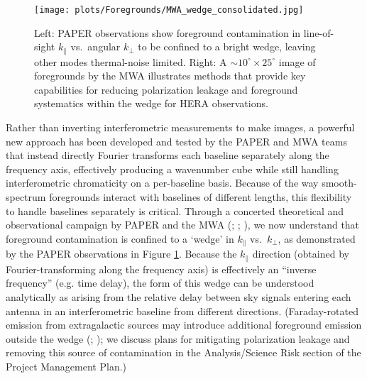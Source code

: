 \documentclass[preprint]{aastex}
\newcommand{\Mycitep}[1]{{\bf \citep{#1}}}
\newcommand{\Mycitealt}[1]{{\bf \citealt{#1}}}
\newcommand{\Caption}[4]{\vspace{#1}\renewcommand{\baselinestretch}{#2}\caption{#4}\vspace{#3}}
\def\kperp{k_{\bot}}
\def\kpar{k_{\|}}
\def\kperp{k_{\bot}}
\def\kpar{k_{\|}}
\begin{document}
\begin{figure}[t] \centering
\texttt{[image: plots/Foregrounds/MWA\_wedge\_consolidated.jpg]}
\Caption{-0.3in}{0.99}{-0.15in}{\small Left:
PAPER observations \Mycitep{pober_et_al2013} show foreground contamination 
in line-of-sight $\kpar$ vs.\ angular $\kperp$ to be
confined to a bright wedge,
leaving other modes thermal-noise limited.
Right:
A $\sim10^{\circ} \times 25^{\circ}$ image of foregrounds by the MWA illustrates
methods that provide key capabilities for reducing
polarization leakage and foreground systematics within the wedge for HERA observations.  
}\label{fig:twoFGViews} \end{figure}


Rather than inverting interferometric measurements to make images,
a powerful new approach has been developed and tested by the PAPER
and MWA teams that instead directly Fourier transforms each baseline separately along the frequency axis,
effectively producing a wavenumber cube while still handling interferometric
chromaticity on a per-baseline basis.  Because of the way smooth-spectrum foregrounds
interact with baselines of different lengths, this flexibility to handle
baselines separately is critical.
Through a concerted theoretical and observational campaign by PAPER and the MWA
(\Mycitealt{morales_et_al2012,parsons_et_al2012b}; \citealt{vedantham_2012}; \Mycitealt{Datta_2010,hazelton_et_al2013,pober_et_al2013,parsons_et_al2013,dillon_et_al2013b}),
we now understand that foreground contamination is confined to a `wedge' in
$\kpar$ vs.\ $\kperp$, as demonstrated by the PAPER observations in 
Figure \ref{fig:twoFGViews}. Because the $\kpar$ direction (obtained by
Fourier-transforming along the frequency axis) is effectively an ``inverse frequency'' (e.g. time delay),
the form of this wedge can be understood analytically as arising from the relative delay between sky signals
entering each antenna in an interferometric baseline from different directions.
(Faraday-rotated emission from extragalactic sources may introduce additional foreground emission outside the wedge (\citealt{labropoulos_et_al2009,jelic_et_al2010}; \Mycitealt{moore_et_al2013});
we discuss plans for mitigating polarization leakage and removing this source
of contamination in the Analysis/Science Risk section of the Project Management Plan.)
\end{document}
